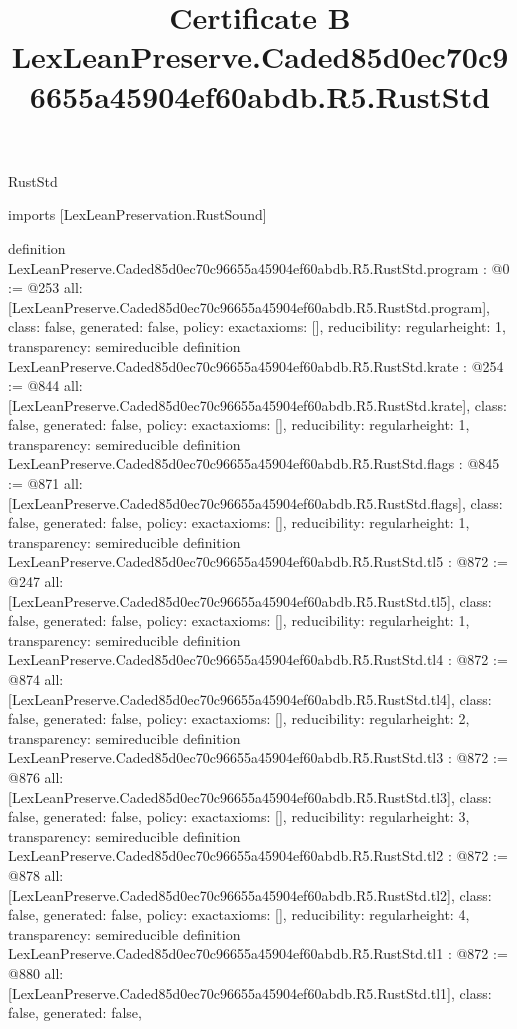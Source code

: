 \begin{lexlean}{RustStd}
\title{Certificate B LexLeanPreserve.Caded85d0ec70c96655a45904ef60abdb.R5.RustStd}
\begin{coremodule}
imports [LexLeanPreservation.RustSound]

definition LexLeanPreserve.Caded85d0ec70c96655a45904ef60abdb.R5.RustStd.program : @0 := @253 {
  all: [LexLeanPreserve.Caded85d0ec70c96655a45904ef60abdb.R5.RustStd.program],
  class: false,
  generated: false,
  policy: exact{axioms: []},
  reducibility: regular{height: 1},
  transparency: semireducible
}
definition LexLeanPreserve.Caded85d0ec70c96655a45904ef60abdb.R5.RustStd.krate : @254 := @844 {
  all: [LexLeanPreserve.Caded85d0ec70c96655a45904ef60abdb.R5.RustStd.krate],
  class: false,
  generated: false,
  policy: exact{axioms: []},
  reducibility: regular{height: 1},
  transparency: semireducible
}
definition LexLeanPreserve.Caded85d0ec70c96655a45904ef60abdb.R5.RustStd.flags : @845 := @871 {
  all: [LexLeanPreserve.Caded85d0ec70c96655a45904ef60abdb.R5.RustStd.flags],
  class: false,
  generated: false,
  policy: exact{axioms: []},
  reducibility: regular{height: 1},
  transparency: semireducible
}
definition LexLeanPreserve.Caded85d0ec70c96655a45904ef60abdb.R5.RustStd.tl5 : @872 := @247 {
  all: [LexLeanPreserve.Caded85d0ec70c96655a45904ef60abdb.R5.RustStd.tl5],
  class: false,
  generated: false,
  policy: exact{axioms: []},
  reducibility: regular{height: 1},
  transparency: semireducible
}
definition LexLeanPreserve.Caded85d0ec70c96655a45904ef60abdb.R5.RustStd.tl4 : @872 := @874 {
  all: [LexLeanPreserve.Caded85d0ec70c96655a45904ef60abdb.R5.RustStd.tl4],
  class: false,
  generated: false,
  policy: exact{axioms: []},
  reducibility: regular{height: 2},
  transparency: semireducible
}
definition LexLeanPreserve.Caded85d0ec70c96655a45904ef60abdb.R5.RustStd.tl3 : @872 := @876 {
  all: [LexLeanPreserve.Caded85d0ec70c96655a45904ef60abdb.R5.RustStd.tl3],
  class: false,
  generated: false,
  policy: exact{axioms: []},
  reducibility: regular{height: 3},
  transparency: semireducible
}
definition LexLeanPreserve.Caded85d0ec70c96655a45904ef60abdb.R5.RustStd.tl2 : @872 := @878 {
  all: [LexLeanPreserve.Caded85d0ec70c96655a45904ef60abdb.R5.RustStd.tl2],
  class: false,
  generated: false,
  policy: exact{axioms: []},
  reducibility: regular{height: 4},
  transparency: semireducible
}
definition LexLeanPreserve.Caded85d0ec70c96655a45904ef60abdb.R5.RustStd.tl1 : @872 := @880 {
  all: [LexLeanPreserve.Caded85d0ec70c96655a45904ef60abdb.R5.RustStd.tl1],
  class: false,
  generated: false,
}
\end{coremodule}
\end{lexlean}
